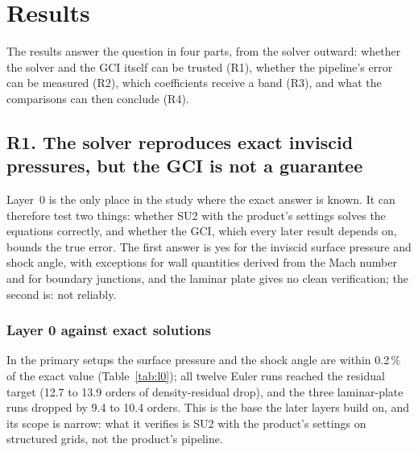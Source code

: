 \documentclass[twocolumn]{labreport}
\begin{document}
\section{Results}
\label{sec:results}

The results answer the question in four parts, from the solver outward: whether the solver and the GCI itself can be trusted (R1), whether the pipeline's error can be measured (R2), which coefficients receive a band (R3), and what the comparisons can then conclude (R4).

\subsection{R1. The solver reproduces exact inviscid pressures, but the GCI is not a guarantee}
\label{sec:r1}

Layer~0 is the only place in the study where the exact answer is known.
It can therefore test two things: whether SU2 with the product's settings solves the equations correctly, and whether the GCI, which every later result depends on, bounds the true error.
The first answer is yes for the inviscid surface pressure and shock angle, with exceptions for wall quantities derived from the Mach number and for boundary junctions, and the laminar plate gives no clean verification; the second is: not reliably.

\subsubsection{Layer 0 against exact solutions}
\label{sec:l0results}

In the primary setups the surface pressure and the shock angle are within 0.2\,\% of the exact value (Table~\ref{tab:l0}); all twelve Euler runs reached the residual target (12.7 to 13.9 orders of density-residual drop), and the three laminar-plate runs dropped by 9.4 to 10.4 orders.
This is the base the later layers build on, and its scope is narrow: what it verifies is SU2 with the product's settings on structured grids, not the product's pipeline.
\end{document}
